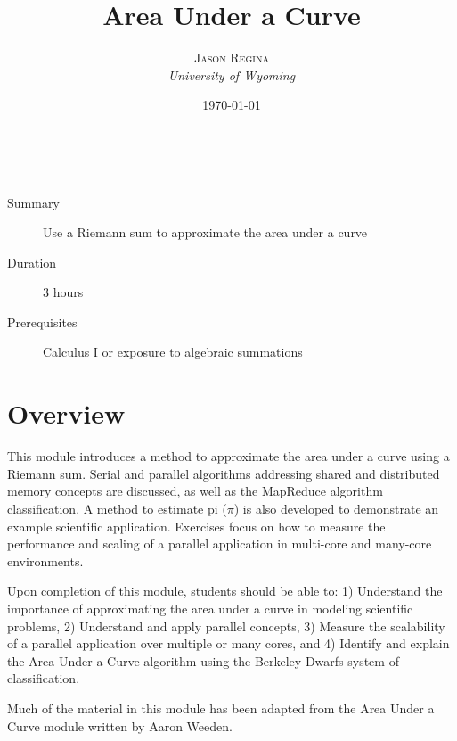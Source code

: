 \documentclass[a4paper, 11pt]{article}
\title{\textbf{Area Under a Curve}}
\author{\textsc{Jason Regina}\\
{\textit{University of Wyoming}}}
\date{\today}
\makeatletter
\renewcommand{\maketitle}
{
	\begin{flushright}
	{\LARGE\@title}

	\vspace{25pt}

	{\large\@author}
	\\\@date

	\end{flushright}
}
\makeatother
\begin{document}
\maketitle
\bigskip


\begin{description}
  \item[Summary] Use a Riemann sum to approximate the area under a curve
  \item[Duration] 3 hours
  \item[Prerequisites] Calculus I or exposure to algebraic summations
\end{description}


\section{Overview}

This module introduces a method to approximate the area under a curve using a Riemann sum. Serial and parallel algorithms addressing shared and distributed memory concepts are discussed, as well as the MapReduce algorithm classification. A method to estimate pi ($\pi$) is also developed to demonstrate an example scientific application. Exercises focus on how to measure the performance and scaling of a parallel application in multi-core and many-core environments. 

Upon completion of this module, students should be able to: 1) Understand the importance of approximating the area under a curve in modeling scientific problems, 2) Understand and apply parallel concepts, 3) Measure the scalability of a parallel application over multiple or many cores, and 4) Identify and explain the Area Under a Curve algorithm using the Berkeley Dwarfs system of classification.

Much of the material in this module has been adapted from the Area Under a Curve module written by Aaron Weeden\cite{website:weeden:2015}.

\end{document}
